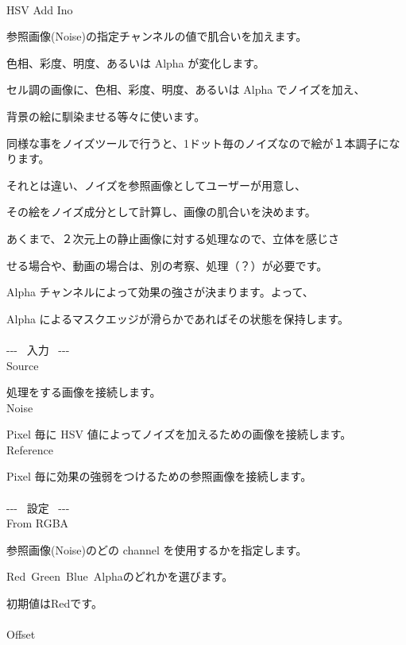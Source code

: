 \documentclass[a4paper,12pt]{article}
\begin{document}
\thispagestyle{empty}

\Large
\noindent \\
HSV Add Ino\medskip
\par
\normalsize
参照画像(Noise)の指定チャンネルの値で肌合いを加えます。\par
色相、彩度、明度、あるいは Alpha が変化します。\\
\par
セル調の画像に、色相、彩度、明度、あるいは Alpha でノイズを加え、\par
背景の絵に馴染ませる等々に使います。\par
同様な事をノイズツールで行うと、1ドット毎のノイズなので絵が１本調子になります。\par
それとは違い、ノイズを参照画像としてユーザーが用意し、\par
その絵をノイズ成分として計算し、画像の肌合いを決めます。\\
\par
あくまで、２次元上の静止画像に対する処理なので、立体を感じさ\par
せる場合や、動画の場合は、別の考察、処理（？）が必要です。\\
\par
Alpha チャンネルによって効果の強さが決まります。よって、\par
Alpha によるマスクエッジが滑らかであればその状態を保持します。\\
\\
-{-}- \ 入力 \ -{-}-\\
Source\par
処理をする画像を接続します。\\
Noise\par
Pixel 毎に HSV 値によってノイズを加えるための画像を接続します。\\
Reference\par
Pixel 毎に効果の強弱をつけるための参照画像を接続します。\\
\\
-{-}- \ 設定 \ -{-}-\\
From RGBA\par
参照画像(Noise)のどの channel を使用するかを指定します。\par
\textquotedbl Red\textquotedbl \ \textquotedbl Green\textquotedbl \ \textquotedbl Blue\textquotedbl \ \textquotedbl Alpha\textquotedbl のどれかを選びます。\par
初期値は\textquotedbl Red\textquotedbl です。\\
\\
Offset\par
\end{document}

